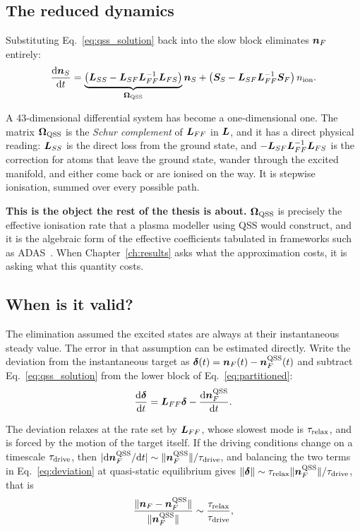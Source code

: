 \subsection{The reduced dynamics}

Substituting Eq.~\eqref{eq:qss_solution} back into the slow block eliminates
$\bm{n}_{F}$ entirely:
\begin{equation}
  \frac{\mathrm{d}\bm{n}_{S}}{\mathrm{d}t}
  = \underbrace{\left(\bm{L}_{SS} - \bm{L}_{SF}\bm{L}_{FF}^{-1}\bm{L}_{FS}\right)}_{\bm{\Omega}_{\mathrm{QSS}}}\bm{n}_{S}
  + \left(\bm{S}_S - \bm{L}_{SF}\bm{L}_{FF}^{-1}\bm{S}_F\right)n_{\mathrm{ion}} .
  \label{eq:reduced}
\end{equation}

A 43-dimensional differential system has become a one-dimensional one. The
matrix $\bm{\Omega}_{\mathrm{QSS}}$ is the \emph{Schur complement} of $\bm{L}_{FF}$ in $\bm{L}$, and
it has a direct physical reading: $\bm{L}_{SS}$ is the direct loss from the
ground state, and $-\bm{L}_{SF}\bm{L}_{FF}^{-1}\bm{L}_{FS}$ is the correction for
atoms that leave the ground state, wander through the excited manifold, and
either come back or are ionised on the way. It is stepwise ionisation, summed
over every possible path.

\textbf{This is the object the rest of the thesis is about.} $\bm{\Omega}_{\mathrm{QSS}}$ is
precisely the effective ionisation rate that a plasma modeller using QSS would
construct, and it is the algebraic form of the effective coefficients tabulated
in frameworks such as ADAS~\cite{Summers2006}. When
Chapter~\ref{ch:results} asks what the approximation costs, it is asking what
this quantity costs.

\subsection{When is it valid?}

The elimination assumed the excited states are always at their instantaneous
steady value. The error in that assumption can be estimated directly. Write the
deviation from the instantaneous target as
$\bm{\delta}(t) = \bm{n}_{F}(t) - \bm{n}_{F}^{\mathrm{QSS}}(t)$ and subtract
Eq.~\eqref{eq:qss_solution} from the lower block of Eq.~\eqref{eq:partitioned}:
\begin{equation}
  \frac{\mathrm{d}\bm{\delta}}{\mathrm{d}t}
  = \bm{L}_{FF}\bm{\delta}
  - \frac{\mathrm{d}\bm{n}_{F}^{\mathrm{QSS}}}{\mathrm{d}t}.
  \label{eq:deviation}
\end{equation}

The deviation relaxes at the rate set by $\bm{L}_{FF}$, whose slowest mode is
$\tau_{\mathrm{relax}}$, and is forced by the motion of the target itself. If the driving
conditions change on a timescale $\tau_{\mathrm{drive}}$, then
$|\mathrm{d}\bm{n}_{F}^{\mathrm{QSS}}/\mathrm{d}t| \sim
\|\bm{n}_{F}^{\mathrm{QSS}}\|/\tau_{\mathrm{drive}}$, and balancing the two terms in
Eq.~\eqref{eq:deviation} at quasi-static equilibrium gives
$\|\bm{\delta}\| \sim \tau_{\mathrm{relax}}\|\bm{n}_{F}^{\mathrm{QSS}}\|/\tau_{\mathrm{drive}}$, that is
\begin{equation}
  \frac{\|\bm{n}_{F} - \bm{n}_{F}^{\mathrm{QSS}}\|}{\|\bm{n}_{F}^{\mathrm{QSS}}\|}
  \sim \frac{\tau_{\mathrm{relax}}}{\tau_{\mathrm{drive}}},
  \label{eq:qss_validity}
\end{equation}

